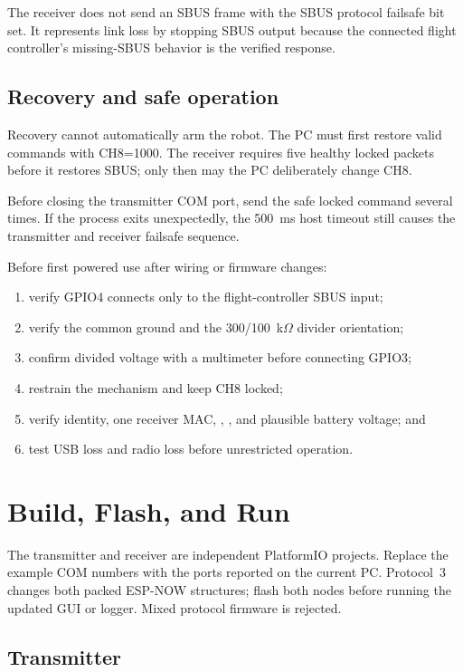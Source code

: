 \documentclass[11pt,a4paper]{article}
\newcommand{\code}[1]{\texttt{\detokenize{#1}}}
\begin{document}
The receiver does not send an SBUS frame with the SBUS protocol failsafe bit
set. It represents link loss by stopping SBUS output because the connected
flight controller's missing-SBUS behavior is the verified response.

\subsection{Recovery and safe operation}

Recovery cannot automatically arm the robot. The PC must first restore valid
commands with CH8=1000. The receiver requires five healthy locked packets before
it restores SBUS; only then may the PC deliberately change CH8.

Before closing the transmitter COM port, send the safe locked command several
times. If the process exits unexpectedly, the 500~ms host timeout still causes
the transmitter and receiver failsafe sequence.

Before first powered use after wiring or firmware changes:

\begin{enumerate}
  \item verify GPIO4 connects only to the flight-controller SBUS input;
  \item verify the common ground and the 300/100~k$\Omega$ divider orientation;
  \item confirm divided voltage with a multimeter before connecting GPIO3;
  \item restrain the mechanism and keep CH8 locked;
  \item verify identity, one receiver MAC, \code{link=1},
        \code{failsafe=0}, and plausible battery voltage; and
  \item test USB loss and radio loss before unrestricted operation.
\end{enumerate}

\section{Build, Flash, and Run}

The transmitter and receiver are independent PlatformIO projects. Replace the
example COM numbers with the ports reported on the current PC. Protocol~3
changes both packed ESP-NOW structures; flash both nodes before running the
updated GUI or logger. Mixed protocol firmware is rejected.

\subsection{Transmitter}
\end{document}
